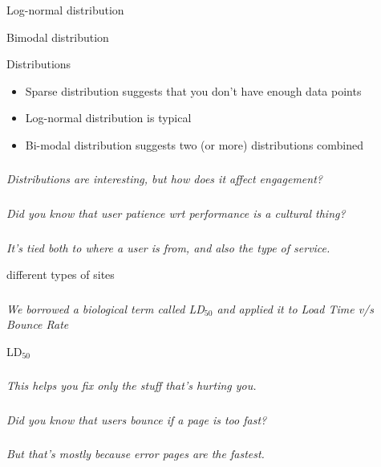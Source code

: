 \documentclass{beamer}
\newcommand{\innersplash}[1]{
  \begin{center}
    \Large \textrm{\textit{ #1 } }
  \end{center}
}
\newcommand{\splashslide}[2][{}]{
  \begin{frame}
  \frametitle{#1}
  \innersplash{#2}
  \end{frame}
}
\newcommand{\textsubscript}[1]{\ensuremath{_{\textrm{#1}}}}
\begin{document}
\begin{frame}{Log-normal distribution}
\end{frame}

\begin{frame}{Bimodal distribution}
\end{frame}

\begin{frame}{Distributions}
\begin{itemize}
  \item Sparse distribution suggests that you don't have enough data points
  \item Log-normal distribution is typical
  \item Bi-modal distribution suggests two (or more) distributions combined
\end{itemize}
\end{frame}

\splashslide{Distributions are interesting, but how does it affect engagement?}

\splashslide{Did you know that user patience wrt performance is a cultural thing?}
\splashslide{It's tied both to where a user is from, and also the type of service.}

\begin{frame}{different types of sites}
\end{frame}

\splashslide{We borrowed a biological term called LD\textsubscript{50} and applied it to Load Time v/s Bounce Rate}

\begin{frame}{LD\textsubscript{50}}
\end{frame}

\splashslide{This helps you fix only the stuff that's hurting you.}

\splashslide{Did you know that users bounce if a page is too fast?}
\splashslide{But that's mostly because error pages are the fastest.}
\end{document}
